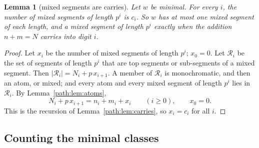 \documentclass[11pt]{article}
\newtheorem{lemma}[theorem]{Lemma}
\theoremstyle{definition}
\theoremstyle{remark}
\numberwithin{equation}{section}
\numberwithin{figure}{section}
\begin{document}
\begin{lemma}[mixed segments are carries]\label{path:lem:mixed}
Let $w$ be minimal. For every $i$, the number of mixed segments of length $p^i$ is $c_i$. So $w$ has at most
one mixed segment of each length, and a mixed segment of length $p^i$ exactly when the addition $n+m=N$ carries
into digit $i$.
\end{lemma}
\begin{proof}
Let $x_i$ be the number of mixed segments of length $p^i$; $x_0=0$. Let $\mathcal R_i$ be the set of segments of
length $p^i$ that are top segments or sub-segments of a mixed segment. Then $|\mathcal R_i|=N_i+p\,x_{i+1}$. A member
of $\mathcal R_i$ is monochromatic, and then an atom, or mixed; and every atom and every mixed segment of length
$p^i$ lies in $\mathcal R_i$. By Lemma~\ref{path:lem:atoms},
\[
N_i+p\,x_{i+1}=n_i+m_i+x_i\qquad(i\ge0),\qquad x_0=0 .
\]
This is the recursion of Lemma~\ref{path:lem:carries}, so $x_i=c_i$ for all $i$.
\end{proof}

\subsection{Counting the minimal classes}\label{path:sec:count}
\end{document}
